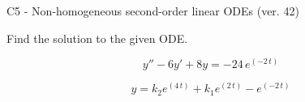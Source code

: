 \begin{exercise}
  \begin{exerciseTitle}C5 - Non-homogeneous second-order linear ODEs (ver. 42)\end{exerciseTitle}
  \begin{exerciseStatement}
    
Find the solution to the given ODE.

    
\[y''-6y'+8y = -24 \, e^{\left(-2 \, t\right)}\]

  \end{exerciseStatement}
  \begin{exerciseAnswer}
    
\[y= k_{2} e^{\left(4 \, t\right)} + k_{1} e^{\left(2 \, t\right)} - e^{\left(-2 \, t\right)}\]

  \end{exerciseAnswer}
\end{exercise}